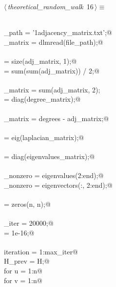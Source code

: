 \documentclass{article}
\begin{document}
\begin{flushleft} \small
\begin{minipage}{\linewidth}\label{scrap20}\raggedright\small
{} $\langle\,${\itshape theoretical_random_walk}\nobreak\ {\footnotesize {16}}$\,\rangle\equiv$
\vspace{-1ex}
\begin{list}{}{} \item
\mbox{}\verb@@\\
\mbox{}\verb@file_path = '1adjacency_matrix.txt';@\\
\mbox{}\verb@adj_matrix = dlmread(file_path);@\\
\mbox{}\verb@@\\
\mbox{}\verb@n = size(adj_matrix, 1);@\\
\mbox{}\verb@m = sum(sum(adj_matrix)) / 2;@\\
\mbox{}\verb@@\\
\mbox{}\verb@degree_matrix = sum(adj_matrix, 2); % Определение переменной degrees@\\
\mbox{}\verb@@\\
\mbox{}\verb@degrees = diag(degree_matrix);@\\
\mbox{}\verb@@\\
\mbox{}\verb@laplacian_matrix = degrees - adj_matrix;@\\
\mbox{}\verb@@\\
\mbox{} = eig(laplacian_matrix);@\\
\mbox{}\verb@@\\
\mbox{}\verb@eigenvalues = diag(eigenvalues_matrix);@\\
\mbox{}\verb@@\\
\mbox{}\verb@eigenvalues_nonzero = eigenvalues(2:end);@\\
\mbox{}\verb@eigenvectors_nonzero = eigenvectors(:, 2:end);@\\
\mbox{}\verb@@\\
\mbox{}\verb@H = zeros(n, n);@\\
\mbox{}\verb@@\\
\mbox{}\verb@max_iter = 20000;@\\
\mbox{}\verb@tol = 1e-16;@\\
\mbox{}\verb@@\\
\mbox{}\verb@for iteration = 1:max_iter@\\
\mbox{}\verb@    H_prev = H;@\\
\mbox{}\verb@    for u = 1:n@\\
\mbox{}\verb@        for v = 1:n@\\

\end{list}
\end{minipage}
\end{flushleft}
\end{document}
